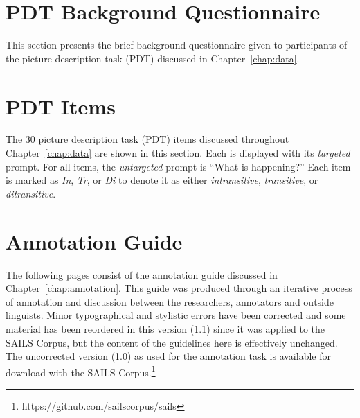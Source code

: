 \begin{appendices}


\chapter{PDT Background Questionnaire}
\label{appendix:questionnaire}
This section presents the brief background questionnaire given to participants of the picture description task (PDT) discussed in Chapter~\ref{chap:data}.

\clearpage



%

\chapter{PDT Items}
\label{appendix:PDT_items}
The 30 picture description task (PDT) items discussed throughout Chapter~\ref{chap:data} are shown in this section. Each is displayed with its \textit{targeted} prompt. For all items, the \textit{untargeted} prompt is ``What is happening?'' Each item is marked as \textit{In}, \textit{Tr}, or \textit{Di} to denote it as either \textit{intransitive}, \textit{transitive}, or \textit{ditransitive}.

\clearpage


%




\chapter{Annotation Guide}
\label{appendix:annotation_guide}
The following pages consist of the annotation guide discussed in Chapter~\ref{chap:annotation}. This guide was produced through an iterative process of annotation and discussion between the researchers, annotators and outside linguists. Minor typographical and stylistic errors have been corrected and some material has been reordered in this version (1.1) since it was applied to the SAILS Corpus, but the content of the guidelines here is effectively unchanged. The uncorrected version (1.0) as used for the annotation task is available for download with the SAILS Corpus.\footnote{https://github.com/sailscorpus/sails}

%


\end{appendices}